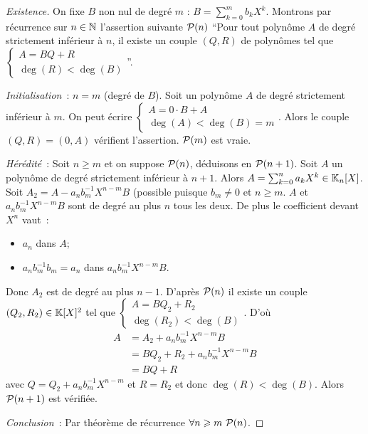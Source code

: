 \begin{proof}[Existence]
  On fixe \(B\) non nul de degré \(m\) : \(B = \sum_{k=0}^m b_k X^k\). Montrons par récurrence sur \(n \in \N\) l'assertion suivante \(\P(n)\) ``Pour tout polynôme \(A\) de degré strictement inférieur à \(n\), il existe un couple \((Q,R)\) de polynômes tel que \(\begin{cases} A=BQ+R \\ \deg(R) < \deg(B)\end{cases}\)''.

  \emph{Initialisation}~: \(n=m\) (degré de \(B\)). Soit un polynôme \(A\) de degré strictement inférieur à \(m\). On peut écrire \(\begin{cases} A=0 \cdot B+A \\ \deg(A) < \deg(B)=m\end{cases}\). Alors le couple \((Q,R)=(0,A)\) vérifient l'assertion. \(\P(m)\) est vraie.

  \emph{Hérédité}~: Soit \(n \geqslant m\) et on suppose \(\P(n)\), déduisons en \(\P(n+1)\). Soit \(A\) un polynôme de degré strictement inférieur à \(n+1\). Alors \(A=\sum_{k=0}^n a_k X^k \in \K_n[X]\). Soit \(A_2 = A-a_nb_m^{-1}X^{n-m}B\) (possible puisque \(b_m \neq 0\) et \(n \geqslant m\). \(A\) et \(a_nb_m^{-1}X^{n-m}B\) sont de degré au plus \(n\) tous les deux. De plus le coefficient devant \(X^n\) vaut~:
  \begin{itemize}
    \item \(a_n\) dans \(A\);
    \item \(a_nb_m^{-1}b_m=a_n\) dans \(a_nb_m^{-1}X^{n-m}B\).
  \end{itemize}
  Donc \(A_2\) est de degré au plus \(n-1\). D'après \(\P(n)\) il existe un couple \((Q_2,R_2) \in \K[X]^2\) tel que \(\begin{cases} A=BQ_2+R_2 \\ \deg(R_2) < \deg(B)\end{cases}\). D'où
  \begin{align}
    A&=A_2 + a_n b_m^{-1}X^{n-m}B\\
     &=BQ_2+R_2 +a_n b_m^{-1}X^{n-m}B\\
     &=BQ+R
  \end{align}
  avec \(Q=Q_2+a_n b_m^{-1}X^{n-m}\) et \(R=R_2\) et donc \(\deg(R) < \deg(B)\). Alors \(\P(n+1)\) est vérifiée.

  \emph{Conclusion}~: Par théorème de récurrence \(\forall n \geqslant m \ \P(n)\).
\end{proof}


